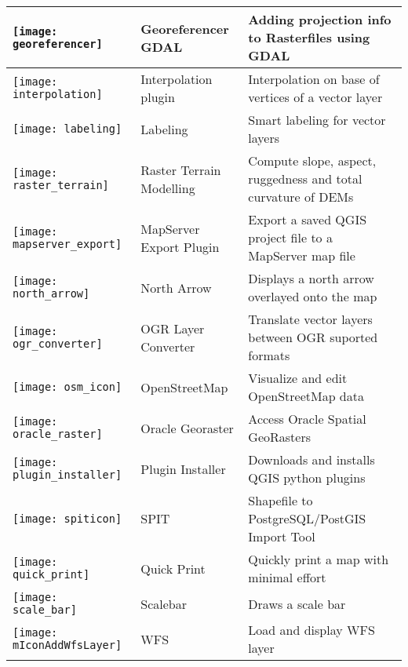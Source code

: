 {\begin{longtable}{|l|l|p{8cm}|}
\hline
\texttt{[image: georeferencer]}
 & Georeferencer GDAL \index{plugin!georeferencer} & Adding projection info to Rasterfiles using GDAL\\
\hline
\texttt{[image: interpolation]}
& Interpolation plugin \index{plugins!Interpolation}& Interpolation on base of vertices of a vector layer\\
\hline
\texttt{[image: labeling]}
& Labeling \index{plugins!Labeling}& Smart labeling for vector layers\\
\hline
\texttt{[image: raster\_terrain]}
& Raster Terrain Modelling \index{plugins!Raster Terrain Modelling}& Compute slope, aspect,
ruggedness and total curvature of DEMs\\
\hline
\texttt{[image: mapserver\_export]}
& MapServer Export Plugin \index{plugins!MapServer Export}& Export a saved QGIS project file to a MapServer map file \\
\hline
\texttt{[image: north\_arrow]}
& North Arrow \index{plugins!north arrow}& Displays a north arrow overlayed onto the map\\
\hline
\texttt{[image: ogr\_converter]}
 & OGR Layer Converter \index{plugins!OGR converter} & Translate vector
layers between OGR suported formats\\
\hline
\texttt{[image: osm\_icon]}
 & OpenStreetMap & Visualize and edit OpenStreetMap data \\
\hline
\texttt{[image: oracle\_raster]}
 & Oracle Georaster \index{plugins!georaster}& Access Oracle Spatial GeoRasters\\
\hline
\texttt{[image: plugin\_installer]}
 & Plugin Installer \index{plugins!Plugin Installer} & Downloads and installs QGIS python plugins\\
\hline
\texttt{[image: spiticon]}
 & SPIT \index{plugins!spit}& Shapefile to PostgreSQL/PostGIS Import Tool \\
\hline
\texttt{[image: quick\_print]}
 & Quick Print \index{plugins!quick print}& Quickly print a map with minimal
effort \\
\hline
\texttt{[image: scale\_bar]}
 & Scalebar \index{plugins!scalebar}& Draws a scale bar\\
\hline
\texttt{[image: mIconAddWfsLayer]}
 & WFS & Load and display WFS layer \\
\hline
\end{longtable}}
